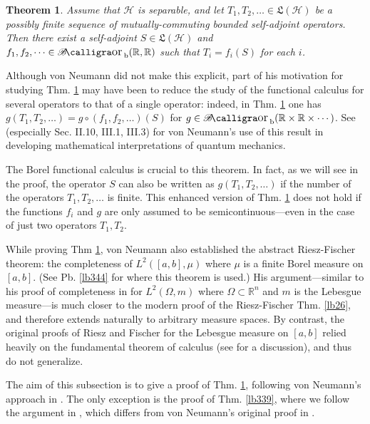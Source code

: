 \documentclass[12pt,b5paper,notitlepage]{article}
\theoremstyle{definition}
\theoremstyle{plain}
\newtheorem{thm}[df]{Theorem}
\DeclareMathOperator{\Borb}{{\mathscr{B}\text{\kern -2pt {\calligra\large or}}\,}_{\mathrm b}}
\newcommand{\fk}{\mathfrak}
\newcommand{\Rbb}{\mathbb R}
\newcommand{\MH}{\mathcal H}
\numberwithin{equation}{section}
\begin{document}
\begin{thm}\label{lb343}
Assume that $\MH$ is separable, and let $T_1,T_2,\dots\in\fk L(\MH)$ be a possibly finite sequence of mutually-commuting bounded self-adjoint operators. Then there exist a self-adjoint $S\in\fk L(\MH)$ and $f_1,f_2,\dots\in\Borb(\Rbb,\Rbb)$ such that $T_i=f_i(S)$ for each $i$.
\end{thm}

Although von Neumann did not make this explicit, part of his motivation for studying Thm. \ref{lb343} may have been to reduce the study of the functional calculus for several operators to that of a single operator: indeed, in Thm. \ref{lb343} one has $g(T_1,T_2,\dots)=g\circ (f_1,f_2,\dots)(S)$ for $g\in\Borb(\Rbb\times\Rbb\times\cdots)$. See \cite{vN32a} (especially Sec. II.10, III.1, III.3) for von Neumann's use of this result in developing mathematical interpretations of quantum mechanics.

The Borel functional calculus is crucial to this theorem. In fact, as we will see in the proof, the operator $S$ can also be written as $g(T_1,T_2,\dots)$ if the number of the operators $T_1,T_2,\dots$ is finite. This enhanced version of Thm. \ref{lb343} does not hold if the functions $f_i$ and $g$ are only assumed to be semicontinuous---even in the case of just two operators $T_1,T_2$. 

While proving Thm \ref{lb343}, von Neumann also established the abstract Riesz-Fischer theorem: the completeness of $L^2([a,b],\mu)$ where $\mu$ is a finite Borel measure on $[a,b]$. (See Pb. \ref{lb344} for where this theorem is used.) His argument---similar to his proof of completeness in \cite[Anhang 2]{vN27} for $L^2(\Omega,m)$ where $\Omega\subset\Rbb^n$ and $m$ is the Lebesgue measure---is much closer to the modern proof of the Riesz-Fischer Thm. \ref{lb26}, and therefore extends naturally to arbitrary measure spaces. By contrast, the original proofs of Riesz and Fischer for the Lebesgue measure on $[a,b]$ relied heavily on the fundamental theorem of calculus (see \cite[Sec. 27.3]{Gui-A} for a discussion), and thus do not generalize.



The aim of this subsection is to give a proof of Thm. \ref{lb343}, following von Neumann's approach in \cite{vN31}. The only exception is the proof of Thm. \ref{lb339}, where we follow the argument in \cite[Lem. II.2.8]{Dav}, which differs from von Neumann's original proof in \cite{vN29b}.
\end{document}
